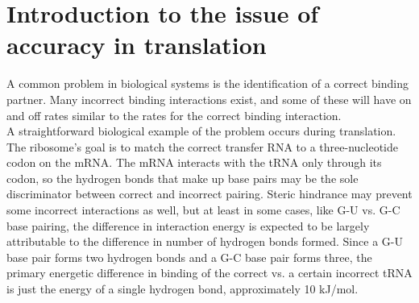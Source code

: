 \documentclass{article}
\begin{document}
\large

\section*{Introduction to the issue of accuracy in translation}

A common problem in biological systems is the identification of a correct binding partner. Many incorrect binding interactions exist, and some of these will have on and off rates similar to the rates for the correct binding interaction.\\

A straightforward biological example of the problem occurs during translation. The ribosome's goal is to match the correct transfer RNA to a three-nucleotide codon on the mRNA. The mRNA interacts with the tRNA only through its codon, so the hydrogen bonds that make up base pairs may be the sole discriminator between correct and incorrect pairing. Steric hindrance may prevent some incorrect interactions as well, but at least in some cases, like G-U vs. G-C base pairing, the difference in interaction energy is expected to be largely attributable to the difference in number of hydrogen bonds formed. Since a G-U base pair forms two hydrogen bonds and a G-C base pair forms three, the primary energetic difference in binding of the correct vs. a certain incorrect tRNA is just the energy of a single hydrogen bond, approximately 10 kJ/mol.\\
\end{document}
